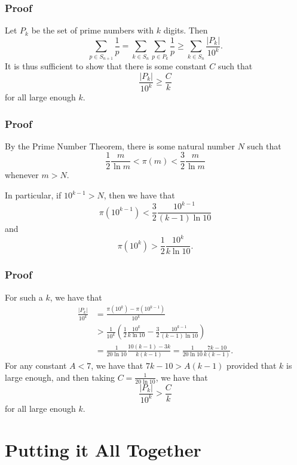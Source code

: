 \documentclass{beamer}
\begin{document}
\begin{frame}
    \frametitle{Proof}

    Let $P_k$ be the set of prime numbers with $k$ digits. Then
    \[
       \sum_{p \in S_{n + 1}} \frac{1}{p} = \sum_{k \in S_n} \sum_{p \in P_k} \frac{1}{p} \geq \sum_{k \in S_n} \frac{\left| P_k \right|}{10^{k}}.
    \]
    \pause
    It is thus sufficient to show that there is some constant $C$ such that
    \[
       \frac{\left| P_k \right|}{10^{k}} \geq \frac{C}{k}    
    \]
    for all large enough $k$.

\end{frame}

\begin{frame}
    \frametitle{Proof}

    By the Prime Number Theorem, there is some natural number $N$ such that
    \[
        \frac{1}{2} \frac{m}{\ln m} < \pi(m) < \frac{3}{2} \frac{m}{\ln m}    
    \]
    whenever $m > N$.

    In particular, if $10^{k - 1} > N$, then we have that
    \[
        \pi\left( 10^{k - 1} \right) < \frac{3}{2} \frac{10^{k - 1}}{(k - 1) \ln 10}
    \]
    and
    \[
        \pi\left( 10^k \right) > \frac{1}{2} \frac{10^k}{k \ln 10}.
    \]

\end{frame}

\begin{frame}
    \frametitle{Proof}

    For such a $k$, we have that
    \begin{align*}
        \frac{\left| P_k \right|}{10^{k}} & = \frac{\pi\left( 10^{k} \right) - \pi\left( 10^{k - 1} \right)}{10^{k}} \\
        & > \frac{1}{10^k} \left( \frac{1}{2} \frac{10^k}{k \ln 10} - \frac{3}{2} \frac{10^{k - 1}}{(k - 1) \ln 10} \right) \\
        & = \frac{1}{20 \ln 10}\frac{10(k - 1) - 3k}{k(k - 1)} = \frac{1}{20 \ln 10} \frac{7k - 10}{k(k - 1)}.
    \end{align*}
    \pause
    For any constant $A < 7$, we have that $7k - 10 > A(k - 1)$ provided that $k$ is large enough, and then taking $C = \frac{1}{20 \ln 10}$, we have that
    \[
        \frac{\left| P_k \right|}{10^{k}} > \frac{C}{k}
    \]
    for all large enough $k$.

\end{frame}

\section{Putting it All Together}
\end{document}
